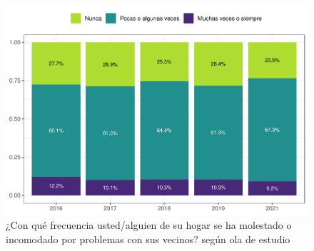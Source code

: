 \documentclass[
  12pt,
]{book}
\begin{document}
\begin{figure}

{\centering \includegraphics{reporte-elsoc_files/figure-latex/confli-olas-1} 

}

\caption{¿Con qué frecuencia usted/alguien de su hogar se ha molestado o incomodado por problemas con sus vecinos? según ola de estudio }\label{fig:confli-olas}
\end{figure}
\end{document}
